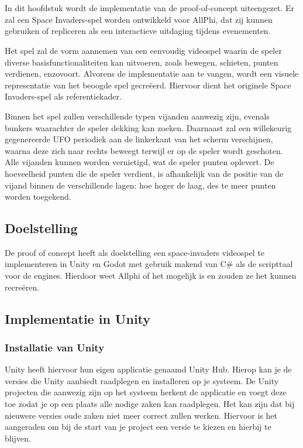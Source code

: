 
\chapter{}%
\label{ch:proof-of-concept}

In dit hoofdstuk wordt de implementatie van de proof-of-concept uiteengezet. Er zal een Space Invaders-spel worden ontwikkeld voor AllPhi, dat zij kunnen gebruiken of repliceren als een interactieve uitdaging tijdens evenementen. 

Het spel zal de vorm aannemen van een eenvoudig videospel waarin de speler diverse basisfunctionaliteiten kan uitvoeren, zoals bewegen, schieten, punten verdienen, enzovoort. Alvorens de implementatie aan te vangen, wordt een visuele representatie van het beoogde spel gecreëerd. Hiervoor dient het originele Space Invaders-spel als referentiekader.

Binnen het spel zullen verschillende typen vijanden aanwezig zijn, evenals bunkers waarachter de speler dekking kan zoeken. Daarnaast zal een willekeurig gegenereerde UFO periodiek aan de linkerkant van het scherm verschijnen, waarna deze zich naar rechts beweegt terwijl er op de speler wordt geschoten. Alle vijanden kunnen worden vernietigd, wat de speler punten oplevert. De hoeveelheid punten die de speler verdient, is afhankelijk van de positie van de vijand binnen de verschillende lagen: hoe hoger de laag, des te meer punten worden toegekend.

\section{Doelstelling}
De proof of concept heeft als doelstelling een space-invaders videospel te implementeren in Unity en Godot met gebruik makend van C\# als de scripttaal voor de engines. Hierdoor weet Allphi of het mogelijk is en zouden ze het kunnen recreëren.

\section{Implementatie in Unity}
\subsection{Installatie van Unity}
Unity heeft hiervoor hun eigen applicatie genaamd Unity Hub. Hierop kan je de versies die Unity aanbiedt raadplegen en installeren op je systeem. De Unity projecten die aanwezig zijn op het systeem herkent de applicatie en voegt deze toe zodat je op een plaats alle nodige zaken kan raadplegen. Het kan zijn dat bij nieuwere versies oude zaken niet meer correct zullen werken. Hiervoor is het aangeraden om bij de start van je project een versie te kiezen en hierbij te blijven.

